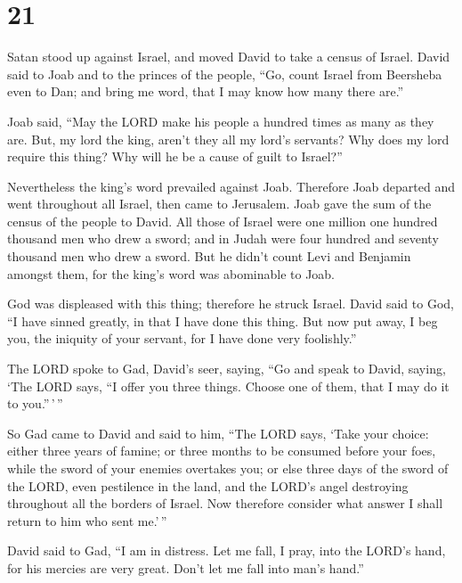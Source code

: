 \hypertarget{section-20}{%
\section{21}\label{section-20}}

 Satan stood up against Israel, and moved David to take a
census of Israel.  David said to Joab and to the princes
of the people, ``Go, count Israel from Beersheba even to Dan; and bring
me word, that I may know how many there are.''

 Joab said, ``May the LORD make his people a hundred times
as many as they are. But, my lord the king, aren't they all my lord's
servants? Why does my lord require this thing? Why will he be a cause of
guilt to Israel?''

 Nevertheless the king's word prevailed against Joab.
Therefore Joab departed and went throughout all Israel, then came to
Jerusalem.  Joab gave the sum of the census of the people
to David. All those of Israel were one million one hundred thousand men
who drew a sword; and in Judah were four hundred and seventy thousand
men who drew a sword.  But he didn't count Levi and
Benjamin amongst them, for the king's word was abominable to Joab.

 God was displeased with this thing; therefore he struck
Israel.  David said to God, ``I have sinned greatly, in
that I have done this thing. But now put away, I beg you, the iniquity
of your servant, for I have done very foolishly.''

 The LORD spoke to Gad, David's seer, saying,
 ``Go and speak to David, saying, `The LORD says, ``I
offer you three things. Choose one of them, that I may do it to
you.''\,'\,''

 So Gad came to David and said to him, ``The LORD says,
`Take your choice:  either three years of famine; or
three months to be consumed before your foes, while the sword of your
enemies overtakes you; or else three days of the sword of the LORD, even
pestilence in the land, and the LORD's angel destroying throughout all
the borders of Israel. Now therefore consider what answer I shall return
to him who sent me.'\,''

 David said to Gad, ``I am in distress. Let me fall, I
pray, into the LORD's hand, for his mercies are very great. Don't let me
fall into man's hand.''

